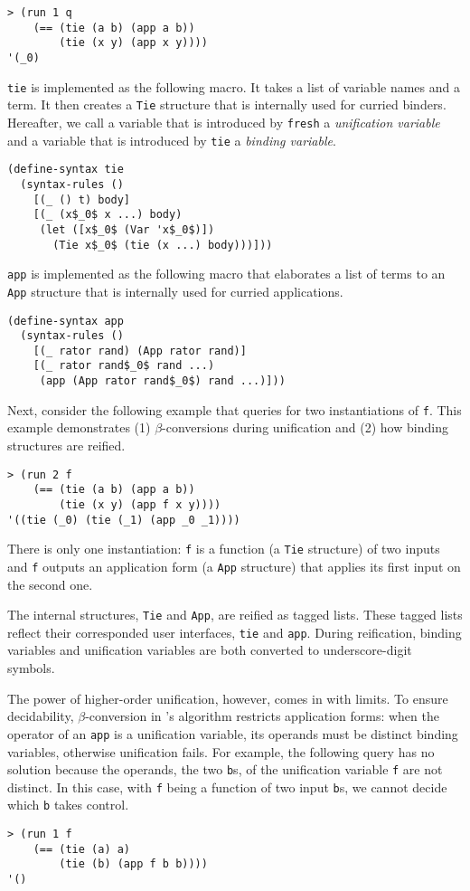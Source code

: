 \documentclass[acmlarge,review]{acmart}
\theoremstyle{definition}
\begin{document}
\begin{lstlisting}
> (run 1 q
    (== (tie (a b) (app a b))
        (tie (x y) (app x y))))
'(_0)
\end{lstlisting}


\texttt{tie} is implemented as the following macro. It takes a list of variable
names and a term. It then creates a \texttt{Tie} structure that is internally
used for curried binders. Hereafter, we call a variable that is introduced
by \texttt{fresh} a \emph{unification variable} and a variable that is
introduced by \texttt{tie} a \emph{binding variable}.

\begin{lstlisting}
(define-syntax tie
  (syntax-rules ()
    [(_ () t) body]
    [(_ (x$_0$ x ...) body)
     (let ([x$_0$ (Var 'x$_0$)])
       (Tie x$_0$ (tie (x ...) body)))]))
\end{lstlisting}

\texttt{app} is implemented as the following macro that elaborates a list of
terms to an \texttt{App} structure that is internally used for curried
applications.

\begin{lstlisting}
(define-syntax app
  (syntax-rules ()
    [(_ rator rand) (App rator rand)]
    [(_ rator rand$_0$ rand ...)
     (app (App rator rand$_0$) rand ...)]))
\end{lstlisting}

Next, consider the following example that queries for two instantiations
of \texttt{f}. This example demonstrates (1) $\beta$-conversions during
unification and (2) how binding structures are reified.

\begin{lstlisting}
> (run 2 f
    (== (tie (a b) (app a b))
        (tie (x y) (app f x y))))
'((tie (_0) (tie (_1) (app _0 _1))))
\end{lstlisting}

There is only one instantiation: \texttt{f} is a function (a \texttt{Tie}
structure) of two inputs and \texttt{f} outputs an application form
(a \texttt{App} structure)
that applies its first input on the second one.

The internal structures, \texttt{Tie} and \texttt{App}, are reified as
tagged lists. These tagged lists reflect their corresponded user interfaces,
\texttt{tie} and \texttt{app}. During reification, binding variables and
unification variables are both converted to underscore-digit symbols.

The power of higher-order unification, however, comes in with limits.
To ensure decidability, $\beta$-conversion in
\citet{miller_logic_1991}'s algorithm restricts application forms:
when the operator of an \texttt{app} is a unification variable, its operands
must be distinct binding variables, otherwise unification fails.
For example, the following query has no solution because the operands,
the two \texttt{b}s, of
the unification variable \texttt{f} are not distinct. In this case, with
\texttt{f} being a function of two input \texttt{b}s, we cannot decide which
\texttt{b} takes control.
\begin{lstlisting}
> (run 1 f
    (== (tie (a) a)
        (tie (b) (app f b b))))
'()
\end{lstlisting}
\end{document}
